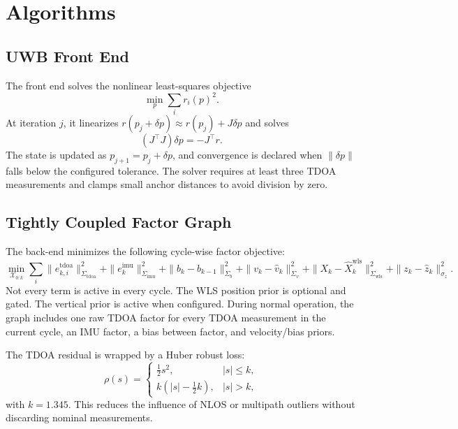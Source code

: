 \documentclass[11pt,a4paper]{article}
\begin{document}
\section{Algorithms}

\subsection{UWB Front End}

The front end solves the nonlinear least-squares objective
\begin{equation}
  \min_p \sum_i r_i(p)^2.
\end{equation}
At iteration \(j\), it linearizes \(r(p_j+\delta p)\approx r(p_j)+J\delta p\) and solves
\begin{equation}
  (J^\top J)\delta p = -J^\top r.
\end{equation}
The state is updated as \(p_{j+1}=p_j+\delta p\), and convergence is declared when \(\|\delta p\|\) falls below the configured tolerance. The solver requires at least three TDOA measurements and clamps small anchor distances to avoid division by zero.

\subsection{Tightly Coupled Factor Graph}

The back-end minimizes the following cycle-wise factor objective:
\begin{equation}
  \min_{\mathcal{X}_{0:k}}
  \sum_i \|e^{\mathrm{tdoa}}_{k,i}\|_{\Sigma_{\mathrm{tdoa}}}^2
  + \|e^{\mathrm{imu}}_k\|_{\Sigma_{\mathrm{imu}}}^2
  + \|b_k-b_{k-1}\|_{\Sigma_b}^2
  + \|v_k-\hat{v}_k\|_{\Sigma_v}^2
  + \|X_k-\hat{X}^{\mathrm{wls}}_k\|_{\Sigma_{\mathrm{wls}}}^2
  + \|z_k-\hat{z}_k\|_{\sigma_z}^2.
\end{equation}
Not every term is active in every cycle. The WLS position prior is optional and gated. The vertical prior is active when configured. During normal operation, the graph includes one raw TDOA factor for every TDOA measurement in the current cycle, an IMU factor, a bias between factor, and velocity/bias priors.

The TDOA residual is wrapped by a Huber robust loss:
\begin{equation}
  \rho(s)=
  \begin{cases}
    \frac{1}{2}s^2, & |s|\le k,\\
    k(|s|-\frac{1}{2}k), & |s|>k,
  \end{cases}
\end{equation}
with \(k=1.345\). This reduces the influence of NLOS or multipath outliers without discarding nominal measurements.
\end{document}
